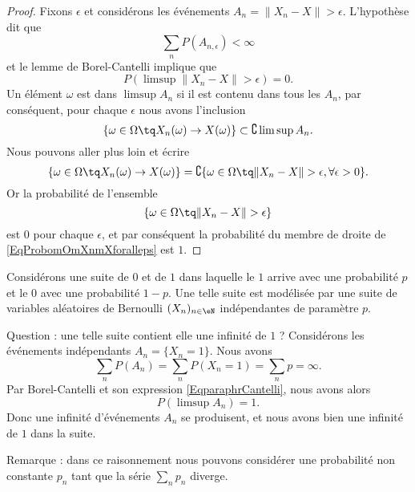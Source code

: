 \begin{proof}
    Fixons \( \epsilon\) et considérons les événements \( A_{n}=\| X_n-X \|>\epsilon\). L'hypothèse dit que
    \begin{equation}
        \sum_nP(A_{n,\epsilon})<\infty
    \end{equation}
    et le lemme de Borel-Cantelli implique que
    \begin{equation}
        P(\limsup\| X_n-X \|>\epsilon)=0.
    \end{equation}
    Un élément \( \omega\) est dans \( \limsup A_n\) si il est contenu dans tous les \( A_n\), par conséquent, pour chaque \( \epsilon\) nous avons l'inclusion
    \begin{equation}
        \{ \omega\in\Omega\tq X_n(\omega)\to X(\omega) \}\subset\complement\limsup A_n.
    \end{equation}
    Nous pouvons aller plus loin et écrire
    \begin{equation}        \label{EqProbomOmXnmXforalleps}
        \{ \omega\in\Omega\tq X_n(\omega)\to X(\omega) \}=\complement\{ \omega\in\Omega\tq \| X_n-X \|>\epsilon,\forall\epsilon>0 \}.
    \end{equation}
    Or la probabilité de l'ensemble
    \begin{equation}
        \{ \omega\in\Omega\tq\| X_n-X \|>\epsilon \}
    \end{equation}
    est \( 0\) pour chaque \( \epsilon\), et par conséquent la probabilité du membre de droite de \eqref{EqProbomOmXnmXforalleps} est \( 1\).
\end{proof}

\begin{example}
    Considérons une suite de \( 0\) et de \( 1\) dans laquelle le \( 1\) arrive avec une probabilité \( p\) et le \( 0\) avec une probabilité \( 1-p\). Une telle suite est modélisée par une suite de variables aléatoires de Bernoulli \( (X_n)_{n\in\eN}\) indépendantes de paramètre \( p\).

    Question : une telle suite contient elle une infinité de \( 1\) ? Considérons les événements indépendants \( A_n=\{ X_n=1 \}\). Nous avons
    \begin{equation}
        \sum_n P(A_n)=\sum_nP(X_n=1)=\sum_np=\infty.
    \end{equation}
    Par Borel-Cantelli et son expression \eqref{EqparaphrCantelli}, nous avons alors
    \begin{equation}
        P(\limsup A_n)=1.
    \end{equation}
    Donc une infinité d'événements \( A_n\) se produisent, et nous avons bien une infinité de \( 1\) dans la suite.

    Remarque : dans ce raisonnement nous pouvons considérer une probabilité non constante \( p_n\) tant que la série \( \sum_np_n\) diverge.
\end{example}


